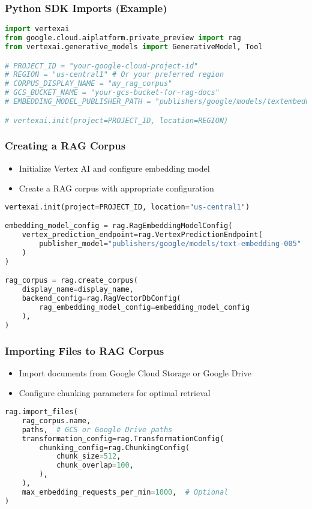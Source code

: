 \begin{frame}[fragile]\frametitle{Python SDK Imports (Example)}
    \begin{lstlisting}[language=python]
import vertexai
from google.cloud.aiplatform.private_preview import rag
from vertexai.generative_models import GenerativeModel, Tool

# PROJECT_ID = "your-google-cloud-project-id"
# REGION = "us-central1" # Or your preferred region
# CORPUS_DISPLAY_NAME = "my_rag_corpus"
# GCS_BUCKET_NAME = "your-gcs-bucket-for-rag-docs"
# EMBEDDING_MODEL_PUBLISHER_PATH = "publishers/google/models/textembedding-gecko@003" # Verify model

# vertexai.init(project=PROJECT_ID, location=REGION)
    \end{lstlisting}
\end{frame}


\begin{frame}[fragile]\frametitle{Creating a RAG Corpus}
      \begin{itemize}
        \item Initialize Vertex AI and configure embedding model
        \item Create a RAG corpus with appropriate configuration
      \end{itemize}
		
        \begin{lstlisting}[language=python]
vertexai.init(project=PROJECT_ID, location="us-central1")

embedding_model_config = rag.RagEmbeddingModelConfig(
    vertex_prediction_endpoint=rag.VertexPredictionEndpoint(
        publisher_model="publishers/google/models/text-embedding-005"
    )
)

rag_corpus = rag.create_corpus(
    display_name=display_name,
    backend_config=rag.RagVectorDbConfig(
        rag_embedding_model_config=embedding_model_config
    ),
)
        \end{lstlisting}
\end{frame}

\begin{frame}[fragile]\frametitle{Importing Files to RAG Corpus}
      \begin{itemize}
        \item Import documents from Google Cloud Storage or Google Drive
        \item Configure chunking parameters for optimal retrieval
      \end{itemize}
		
        \begin{lstlisting}[language=python]
rag.import_files(
    rag_corpus.name,
    paths,  # GCS or Google Drive paths
    transformation_config=rag.TransformationConfig(
        chunking_config=rag.ChunkingConfig(
            chunk_size=512,
            chunk_overlap=100,
        ),
    ),
    max_embedding_requests_per_min=1000,  # Optional
)
        \end{lstlisting}
\end{frame}

